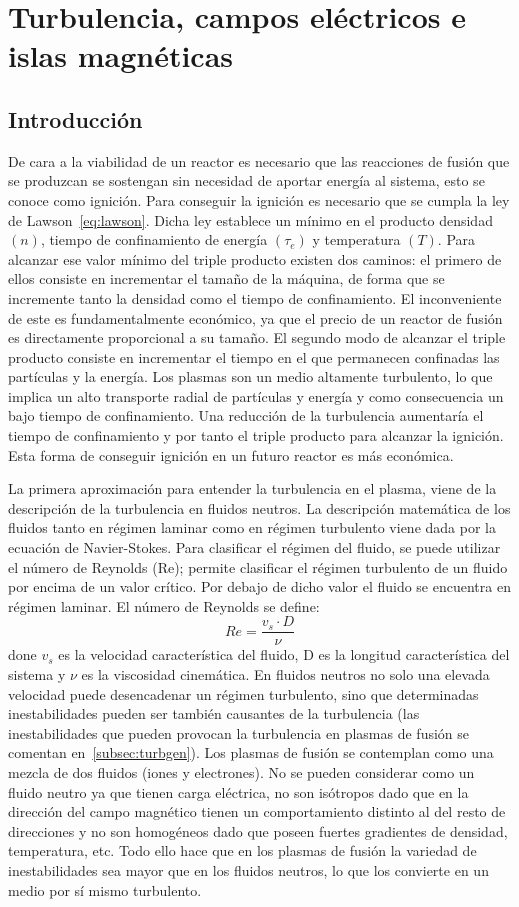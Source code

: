 \chapter{Turbulencia, campos eléctricos e islas magnéticas}
\section{Introducción}
De cara a la viabilidad de un reactor es necesario que las reacciones de fusión que se
produzcan se sostengan sin necesidad de aportar energía al sistema, esto se conoce como ignición. 
Para conseguir la ignición es necesario que se cumpla la ley de Lawson~\eqref{eq:lawson}. Dicha
ley establece un mínimo en el producto densidad $(n)$, tiempo de confinamiento
de energía $(\tau_e)$ y temperatura $(T)$.
Para alcanzar ese valor mínimo del triple producto existen dos caminos: el primero de ellos consiste
en incrementar el tamaño de la máquina, de forma que se incremente tanto la densidad como
el tiempo de confinamiento. El inconveniente de este es fundamentalmente económico, ya
que el precio de un reactor de fusión es directamente proporcional a su tamaño. El segundo
modo de alcanzar el triple producto consiste en incrementar el tiempo en el que permanecen
confinadas las partículas y la energía. Los plasmas son un medio altamente turbulento, lo que
implica un alto transporte radial de partículas y energía y como consecuencia un bajo tiempo
de confinamiento. Una reducción de la turbulencia aumentaría el tiempo de confinamiento y
por tanto el triple producto para alcanzar la ignición. Esta forma de conseguir ignición en un
futuro reactor es más económica.\par
La primera aproximación para entender la turbulencia en el plasma, viene de la descripción 
de la turbulencia en fluidos neutros. La descripción matemática de los fluidos tanto en
régimen laminar como en régimen turbulento viene dada por la ecuación de Navier-Stokes.
Para clasificar el régimen del fluido, se puede utilizar el número de Reynolds (Re); permite
clasificar el régimen turbulento de un fluido por encima de un valor crítico. Por debajo
de dicho valor el fluido se encuentra en régimen laminar. El número de Reynolds se define:
\begin{equation}\label{eq:reynolds}
    Re=\frac{v_s\cdot D}{\nu}
\end{equation}
done $v_s$ es la velocidad característica del fluido, D es la longitud característica del sistema y
$\nu$ es la viscosidad cinemática. En fluidos neutros no solo una elevada velocidad puede desencadenar
un régimen turbulento, sino que determinadas inestabilidades pueden ser también
causantes de la turbulencia (las inestabilidades que pueden provocan la turbulencia en plasmas de
fusión se comentan en~\ref{subsec:turbgen}).
Los plasmas de fusión se contemplan como una mezcla de dos fluidos (iones y electrones). No
se pueden considerar como un fluido neutro ya que tienen carga eléctrica, no son isótropos
dado que en la dirección del campo magnético tienen un comportamiento distinto al del resto
de direcciones y no son homogéneos dado que poseen fuertes gradientes de densidad, temperatura,
etc. Todo ello hace que en los plasmas de fusión la variedad de inestabilidades sea
mayor que en los fluidos neutros, lo que los convierte en un medio por sí mismo turbulento.
